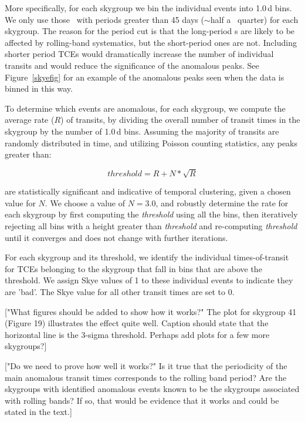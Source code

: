More specifically, for each skygroup we bin the individual events into 1.0\,d bins. We only use those \opstce\ with periods greater than 45 days ($\sim$half a \Kepler\ quarter) for each skygroup. The reason for the period cut is that the long-period \opstce s are likely to be affected by rolling-band systematics, but the short-period ones are not.  Including shorter period TCEs would dramatically increase the number of individual transits and would reduce the significance of the anomalous peaks.  See Figure~\ref{skyefig} for an example of the anomalous peaks seen when the data is binned in this way.

To determine which events are anomalous, for each skygroup, we compute the average rate ($R$) of transits, by dividing the overall number of transit times in the skygroup by the number of 1.0\,d bins. Assuming the majority of transits are randomly distributed in time, and utilizing Poisson counting statistics, any peaks greater than:

\begin{equation}
threshold = R + N*\sqrt{R}
\end{equation}

\noindent are statistically significant and indicative of temporal clustering, given a chosen value for $N$. We choose a value of $N = 3.0$, and robustly determine the rate for each skygroup by first computing the \emph{threshold} using all the bins, then iteratively rejecting all bins with a height greater than \emph{threshold} and re-computing \emph{threshold} until it converges and does not change with further iterations.

For each skygroup and its threshold, we identify the individual times-of-transit for TCEs belonging to the skygroup that fall in bins that are above the threshold. We assign Skye values of 1 to these individual events to indicate they are 'bad'. The Skye value for all other transit times are set to 0.  

["What figures should be added to show how it works?" The plot for skygroup 41 (Figure 19) illustrates the effect quite well. Caption should state that the horizontal line is the 3-sigma threshold. Perhaps add  plots for a few more skygroups?]

["Do we need to prove how well it works?" Is it true that the periodicity of the main anomalous transit times corresponds to the rolling band period?  Are the skygroups with identified anomalous events known to be the skygroups associated with rolling bands? If so, that would be evidence that it works and could be stated in the text.]




